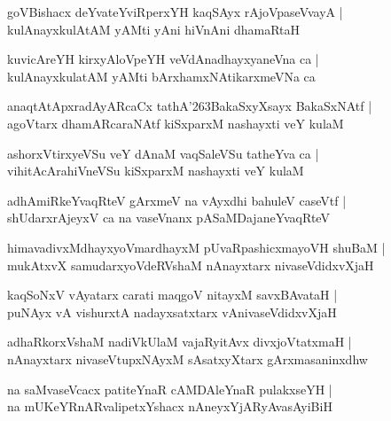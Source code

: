 \documentclass[twoside,12pt,openright]{book}
\def\S{\char'263}
\newcounter{shloka}[chapter]
\begin{document}
\begin{shloka}
goVBishacx deYvateYviRperxYH kaqSAyx rAjoVpaseVvayA |\\
kulAnayxkulAtAM yAMti yAni hiVnAni dhamaRtaH 
\end{shloka}

\begin{shloka}
kuvicAreYH kirxyAloVpeYH veVdAnadhayxyaneVna ca |\\
kulAnayxkulatAM yAMti bArxhamxNAtikarxmeVNa ca 
\end{shloka}

\begin{shloka}
anaqtAtApxradAyARcaCx tathA\S BakaSxyXsayx BakaSxNAtf |\\
agoVtarx dhamARcaraNAtf kiSxparxM nashayxti veY kulaM 
\end{shloka}

\begin{shloka}
ashorxVtirxyeVSu veY dAnaM vaqSaleVSu tatheYva ca |\\
vihitAcArahiVneVSu kiSxparxM nashayxti veY kulaM 
\end{shloka}

\begin{shloka}
adhAmiRkeYvaqRteV gArxmeV na vAyxdhi bahuleV caseVtf |\\
shUdarxrAjeyxV ca na vaseVnanx pASaMDajaneYvaqRteV 
\end{shloka}

\begin{shloka}
himavadivxMdhayxyoVmardhayxM pUvaRpashicxmayoVH shuBaM |\\
mukAtxvX samudarxyoVdeRVshaM nAnayxtarx nivaseVdidxvXjaH 
\end{shloka}

\begin{shloka}
kaqSoNxV vAyatarx carati maqgoV nitayxM savxBAvataH |\\
puNAyx vA vishurxtA nadayxsatxtarx vAnivaseVdidxvXjaH 
\end{shloka}

\begin{shloka}
adhaRkorxVshaM nadiVkUlaM vajaRyitAvx divxjoVtatxmaH |\\
nAnayxtarx nivaseVtupxNAyxM sAsatxyXtarx gArxmasaninxdhw
\end{shloka}

\begin{shloka}
na saMvaseVcacx patiteYnaR cAMDAleYnaR pulakxseYH |\\
na mUKeYRnARvalipetxYshacx nAneyxYjARyAvasAyiBiH 
\end{shloka}
\end{document}

